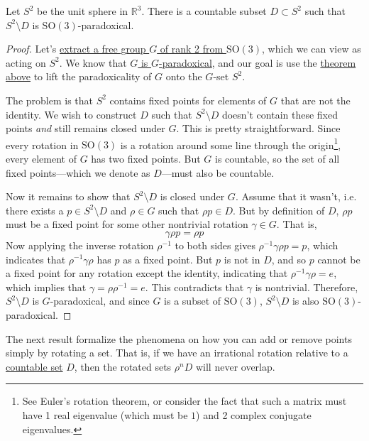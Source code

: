   \begin{theorem}
    \label{thm:hausdorff}
    Let $S^2$ be the unit sphere in $\mathbb{R}^3$. There is a countable subset $D \subset S^2$ such that $S^2 \setminus D$ is $\mathrm{SO}(3)$-paradoxical.
  \end{theorem}
  \begin{proof}
    Let's \hyperref[thm:free-subgroup]{extract a free group $G$ of rank 2 from $\mathrm{SO}(3)$}, which we can view as acting on $S^2$. We know that \hyperref[thm:rank2-paradox]{$G$ is $G$-paradoxical}, and our goal is use the \hyperref[thm:lift]{theorem above} to lift the paradoxicality of $G$ onto the $G$-set $S^2$. 

    The problem is that $S^2$ contains fixed points for elements of $G$ that are not the identity. We wish to construct $D$ such that $S^2 \setminus D$ doesn't contain these fixed points \textit{and} still remains closed under $G$. This is pretty straightforward. Since every rotation in $\mathrm{SO}(3)$ is a rotation around some line through the origin\footnote{See Euler's rotation theorem, or consider the fact that such a matrix must have 1 real eigenvalue (which must be $1$) and 2 complex conjugate eigenvalues.}, every element of $G$ has two fixed points. But $G$ is countable, so the set of all fixed points---which we denote as $D$---must also be countable. 

    Now it remains to show that $S^2 \setminus D$ is closed under $G$. Assume that it wasn't, i.e. there exists a $p \in S^2 \setminus D$ and $\rho \in G$ such that $\rho p \in D$. But by definition of $D$, $\rho p$ must be a fixed point for some other nontrivial rotation $\gamma \in G$. That is, 
    \begin{equation}
      \gamma \rho p = \rho p
    \end{equation} 
    Now applying the inverse rotation $\rho^{-1}$ to both sides gives $\rho^{-1} \gamma \rho p = p$, which indicates that $\rho^{-1} \gamma \rho$ has $p$ as a fixed point. But $p$ is not in $D$, and so $p$ cannot be a fixed point for any rotation except the identity, indicating that $\rho^{-1} \gamma \rho = e$, which implies that $\gamma = \rho \rho^{-1} = e$. This contradicts that $\gamma$ is nontrivial. Therefore, $S^2 \setminus D$ is $G$-paradoxical, and since $G$ is a subset of $\mathrm{SO}(3)$, $S^2 \setminus D$ is also $\mathrm{SO}(3)$-paradoxical. 
  \end{proof} 

  The next result formalize the phenomena on how you can add or remove points simply by rotating a set. That is, if we have an irrational rotation relative to a \hyperref[def:countable]{countable set} $D$, then the rotated sets $\rho^n D$ will never overlap. 

